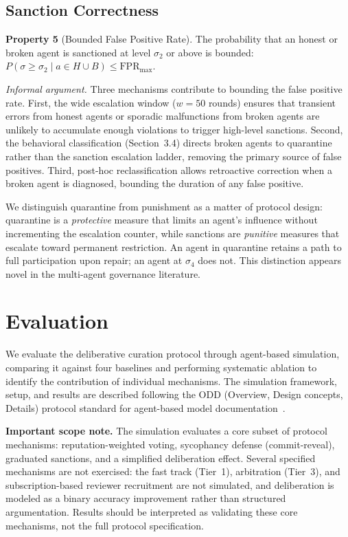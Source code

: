 \documentclass[11pt]{article}
\begin{document}
\subsection{Sanction Correctness}

\textbf{Property 5} (Bounded False Positive Rate). The probability that an honest or broken agent is sanctioned at level $\sigma_2$ or above is bounded: $P(\sigma \geq \sigma_2 \mid a \in H \cup B) \leq \text{FPR}_{\max}$.

\textit{Informal argument.} Three mechanisms contribute to bounding the false positive rate. First, the wide escalation window ($w = 50$ rounds) ensures that transient errors from honest agents or sporadic malfunctions from broken agents are unlikely to accumulate enough violations to trigger high-level sanctions. Second, the behavioral classification (Section~3.4) directs broken agents to quarantine rather than the sanction escalation ladder, removing the primary source of false positives. Third, post-hoc reclassification allows retroactive correction when a broken agent is diagnosed, bounding the duration of any false positive.

We distinguish quarantine from punishment as a matter of protocol design: quarantine is a \textit{protective} measure that limits an agent's influence without incrementing the escalation counter, while sanctions are \textit{punitive} measures that escalate toward permanent restriction. An agent in quarantine retains a path to full participation upon repair; an agent at $\sigma_4$ does not. This distinction appears novel in the multi-agent governance literature.

\section{Evaluation}

We evaluate the deliberative curation protocol through agent-based simulation, comparing it against four baselines and performing systematic ablation to identify the contribution of individual mechanisms. The simulation framework, setup, and results are described following the ODD (Overview, Design concepts, Details) protocol standard for agent-based model documentation~\cite{grimm2020}.

\textbf{Important scope note.} The simulation evaluates a core subset of protocol mechanisms: reputation-weighted voting, sycophancy defense (commit-reveal), graduated sanctions, and a simplified deliberation effect. Several specified mechanisms are not exercised: the fast track (Tier~1), arbitration (Tier~3), and subscription-based reviewer recruitment are not simulated, and deliberation is modeled as a binary accuracy improvement rather than structured argumentation. Results should be interpreted as validating these core mechanisms, not the full protocol specification.
\end{document}
